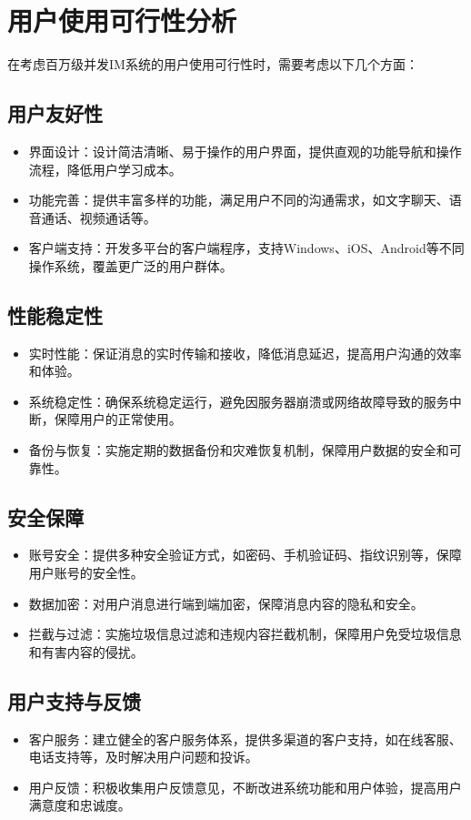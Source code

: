 \documentclass[12pt]{article}
\begin{document}
\section{用户使用可行性分析}
在考虑百万级并发IM系统的用户使用可行性时，需要考虑以下几个方面：

\subsection{用户友好性}
\begin{itemize}
	\item 界面设计：设计简洁清晰、易于操作的用户界面，提供直观的功能导航和操作流程，降低用户学习成本。
	\item 功能完善：提供丰富多样的功能，满足用户不同的沟通需求，如文字聊天、语音通话、视频通话等。
	\item 客户端支持：开发多平台的客户端程序，支持Windows、iOS、Android等不同操作系统，覆盖更广泛的用户群体。
\end{itemize}

\subsection{性能稳定性}
\begin{itemize}
	\item 实时性能：保证消息的实时传输和接收，降低消息延迟，提高用户沟通的效率和体验。
	\item 系统稳定性：确保系统稳定运行，避免因服务器崩溃或网络故障导致的服务中断，保障用户的正常使用。
	\item 备份与恢复：实施定期的数据备份和灾难恢复机制，保障用户数据的安全和可靠性。
\end{itemize}

\subsection{安全保障}
\begin{itemize}
	\item 账号安全：提供多种安全验证方式，如密码、手机验证码、指纹识别等，保障用户账号的安全性。
	\item 数据加密：对用户消息进行端到端加密，保障消息内容的隐私和安全。
	\item 拦截与过滤：实施垃圾信息过滤和违规内容拦截机制，保障用户免受垃圾信息和有害内容的侵扰。
\end{itemize}

\subsection{用户支持与反馈}
\begin{itemize}
	\item 客户服务：建立健全的客户服务体系，提供多渠道的客户支持，如在线客服、电话支持等，及时解决用户问题和投诉。
	\item 用户反馈：积极收集用户反馈意见，不断改进系统功能和用户体验，提高用户满意度和忠诚度。
\end{itemize}
	
\end{document}

